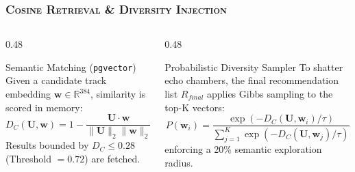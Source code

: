 \documentclass[aspectratio=169,10pt]{beamer}
\begin{document}
\begin{frame}
  \frametitle{\textsc{Cosine Retrieval \& Diversity Injection}}
  
  \begin{columns}[T]
    \begin{column}{0.48\textwidth}
      \begin{exampleblock}{Semantic Matching (\texttt{pgvector})}
        \fontsize{7.5pt}{9.5pt}\selectfont
        Given a candidate track embedding $\mathbf{w} \in \mathbb{R}^{384}$, similarity is scored in memory:
        \begin{equation}
            D_C(\mathbf{U}, \mathbf{w}) = 1 - \frac{\mathbf{U} \cdot \mathbf{w}}{\|\mathbf{U}\|_2 \|\mathbf{w}\|_2}
        \end{equation}
        Results bounded by $D_C \le 0.28$ (Threshold $= 0.72$) are fetched.
      \end{exampleblock}
    \end{column}
    \begin{column}{0.48\textwidth}
      \begin{block}{Probabilistic Diversity Sampler}
        \fontsize{7.5pt}{9.5pt}\selectfont
        To shatter echo chambers, the final recommendation list $R_{final}$ applies Gibbs sampling to the top-K vectors:
        \begin{equation}
            P(\mathbf{w}_i) = \frac{\exp(-D_C(\mathbf{U}, \mathbf{w}_i) / \tau)}{\sum_{j=1}^K \exp(-D_C(\mathbf{U}, \mathbf{w}_j) / \tau)}
        \end{equation}
        enforcing a 20\% semantic exploration radius.
      \end{block}
    \end{column}
  \end{columns}
\end{frame}

\end{document}
